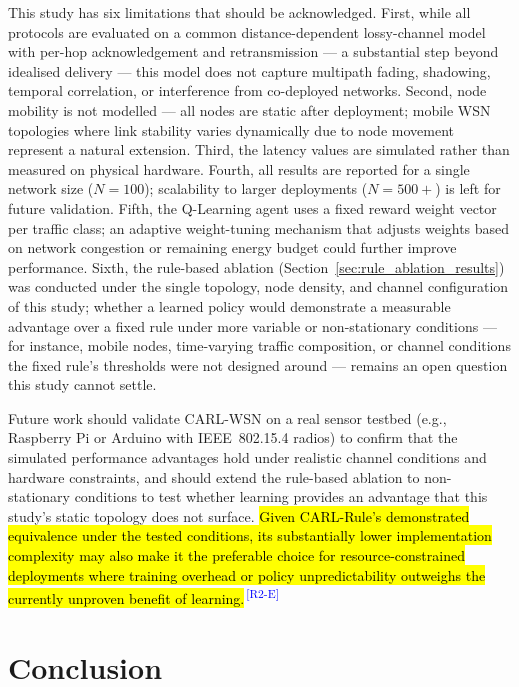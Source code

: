 \documentclass[12pt]{article}
\newcommand{\rtag}[1]{\textsuperscript{\textcolor{blue}{\scriptsize\,[#1]}}}
\newcommand{\hlx}[1]{{\exhyphenpenalty=10000\hyphenpenalty=10000\let\ \nobreakspace\hl{#1}}}
\begin{document}
This study has six limitations that should be acknowledged.
First, while all protocols are evaluated on a common
distance-dependent lossy-channel model with per-hop acknowledgement
and retransmission --- a substantial step beyond idealised
delivery --- this model does not capture multipath fading,
shadowing, temporal correlation, or interference from co-deployed
networks. Second, node mobility is not modelled --- all nodes are static
after deployment; mobile WSN topologies where link stability
varies dynamically due to node movement represent a natural
extension. Third, the latency values are simulated rather than
measured on physical hardware. Fourth, all results are reported
for a single network size ($N = 100$); scalability to larger
deployments ($N = 500{+}$) is left for future validation. Fifth,
the Q-Learning agent uses a fixed reward weight vector per traffic
class; an adaptive weight-tuning mechanism that adjusts weights
based on network congestion or remaining energy budget could
further improve performance. Sixth, the rule-based ablation
(Section~\ref{sec:rule_ablation_results}) was conducted under the
single topology, node density, and channel configuration of this
study; whether a learned policy would demonstrate a measurable
advantage over a fixed rule under more variable or non-stationary
conditions --- for instance, mobile nodes, time-varying traffic
composition, or channel conditions the fixed rule's thresholds were
not designed around --- remains an open question this study cannot
settle.

Future work should validate CARL-WSN on a real sensor testbed
(e.g., Raspberry Pi or Arduino with IEEE~802.15.4 radios) to
confirm that the simulated performance advantages hold under
realistic channel conditions and hardware constraints, and should
extend the rule-based ablation to non-stationary conditions to test
whether learning provides an advantage that this study's static
topology does not surface. \hlx{Given CARL-Rule's demonstrated
equivalence under the tested conditions, its substantially lower
implementation complexity may also make it the preferable choice for
resource-constrained deployments where training overhead or policy
unpredictability outweighs the currently unproven benefit of
learning.}\rtag{R2-E}


\section{Conclusion}
\label{sec:conclusion}
\end{document}

